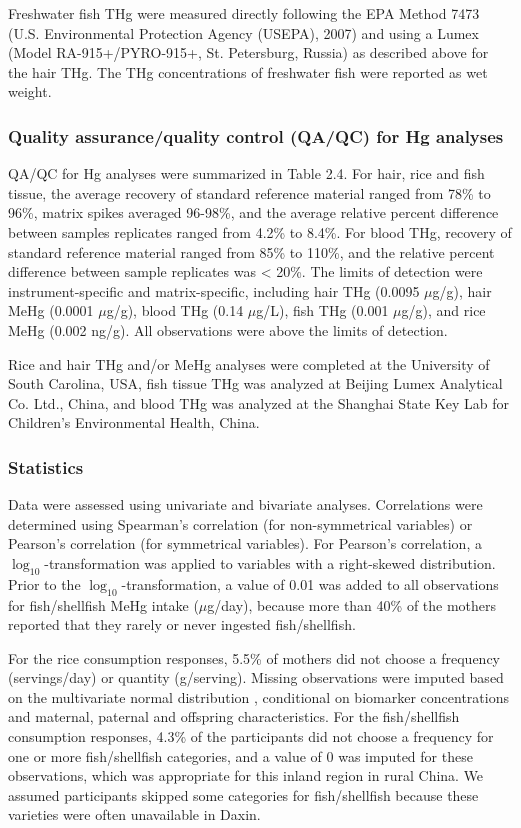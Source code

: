 Freshwater fish THg were measured directly following the EPA Method 7473 (U.S. Environmental Protection Agency (USEPA), 2007) and using a Lumex (Model RA-915+/PYRO-915+, St. Petersburg, Russia) as described above for the hair THg. The THg concentrations of freshwater fish were reported as wet weight. 

\subsubsection{Quality assurance/quality control (QA/QC) for Hg analyses}

QA/QC for Hg analyses were summarized in Table 2.4. For hair, rice and fish tissue, the average recovery of standard reference material ranged from 78\% to 96\%, matrix spikes averaged 96-98\%, and the average relative percent difference between samples replicates ranged from 4.2\% to 8.4\%. For blood THg, recovery of standard reference material ranged from 85\% to 110\%, and the relative percent difference between sample replicates was < 20\%. The limits of detection were instrument-specific and matrix-specific, including hair THg (0.0095 \({\mu}\)g/g), hair MeHg (0.0001 \({\mu}\)g/g), blood THg (0.14 \({\mu}\)g/L), fish THg (0.001 \({\mu}\)g/g), and rice MeHg (0.002 ng/g). All observations were above the limits of detection.

Rice and hair THg and/or MeHg analyses were completed at the University of South Carolina, USA, fish tissue THg was analyzed at Beijing Lumex Analytical Co. Ltd., China, and blood THg was analyzed at the Shanghai State Key Lab for Children's Environmental Health, China.

\subsubsection{Statistics}

Data were assessed using univariate and bivariate analyses. Correlations were determined using Spearman's correlation (for non-symmetrical variables) or Pearson's correlation (for symmetrical variables). For Pearson's correlation, a $\log_{10}$-transformation was applied to variables with a right-skewed distribution. Prior to the $\log_{10}$-transformation, a value of 0.01 was added to all observations for fish/shellfish MeHg intake (\({\mu}\)g/day), because more than 40\% of the mothers reported that they rarely or never ingested fish/shellfish. 

For the rice consumption responses, 5.5\% of mothers did not choose a frequency (servings/day) or quantity (g/serving). Missing observations were imputed based on the multivariate normal distribution \citep{schafer1997analysis}, conditional on biomarker concentrations and maternal, paternal and offspring characteristics. For the fish/shellfish consumption responses, 4.3\% of the participants did not choose a frequency for one or more fish/shellfish categories, and a value of 0 was imputed for these observations, which was appropriate for this inland region in rural China. We assumed participants skipped some categories for fish/shellfish because these varieties were often unavailable in Daxin. 

